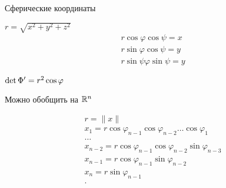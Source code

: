 \begin{example}
    Сферические координаты

    $r = \sqrt{x^2 + y ^2 + z^2}$
    \begin{align*}
        r\cos \varphi \cos \psi = x \\
        r\sin \varphi \cos \psi = y \\
        r\sin \psi \varphi \sin \psi = y
    \end{align*}

    $\det \Phi^{\prime} = r^2\cos\varphi$    
    
    Можно обобщить на $\mathbb{R}^n$

    \begin{align*}
        r = \|x\|\\
        x_1 = r\cos\varphi_{n-1}\cos\varphi_{n-2} \ldots \cos\varphi_{1}\\
        \ldots\\
        x_{n-2} = r\cos\varphi_{n-1}\cos\varphi_{n-2}\sin\varphi_{n-3}\\
        x_{n-1} = r\cos\varphi_{n-1}\sin \varphi_{n-2}\\
        x_n = r\sin\varphi_{n-1}\\
    .\end{align*}

\end{example}

